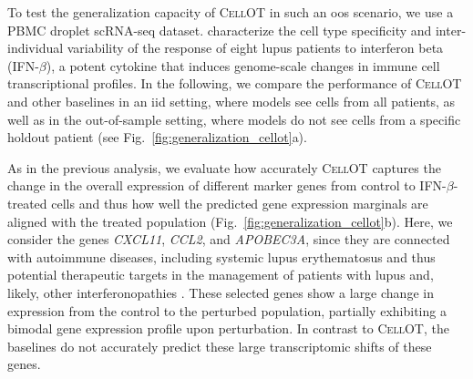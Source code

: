 To test the generalization capacity of \textsc{CellOT} in such an \acrfull{oos} scenario, we use a \acrfull{PBMC} droplet scRNA-seq dataset. \citet{kang2018multiplexed} characterize the cell type specificity and inter-individual variability of the response of eight lupus patients to interferon beta (IFN-$\beta$), a potent cytokine that induces genome-scale changes in immune cell transcriptional profiles. 
In the following, we compare the performance of \textsc{CellOT} and other baselines in an \acrfull{iid} setting, where models see cells from all patients, as well as in the out-of-sample setting, where models do not see cells from a specific holdout patient (see Fig.~\ref{fig:generalization_cellot}a).
    
As in the previous analysis, we evaluate how accurately \textsc{CellOT} captures the change in the overall expression of different marker genes from control to IFN-$\beta$-treated cells and thus how well the predicted gene expression marginals are aligned with the treated population (Fig.~\ref{fig:generalization_cellot}b). Here, we consider the genes \textit{CXCL11}, \textit{CCL2}, and \textit{APOBEC3A},
since they are connected with autoimmune diseases, including systemic lupus erythematosus \citep{hedrich2011epigenetic, perez2021sustained}
and thus potential therapeutic targets
in the management of patients with lupus and, likely, other interferonopathies \citep{mathian2015targeting,rani1996characterization,hedrich2011epigenetic,mathian2015targeting,perez2021sustained,flier2001differential}.
These selected genes show a large change in expression from the control to the perturbed population, partially exhibiting a bimodal gene expression profile upon perturbation. In contrast to \textsc{CellOT}, the baselines do not accurately predict these large transcriptomic shifts of these genes.


